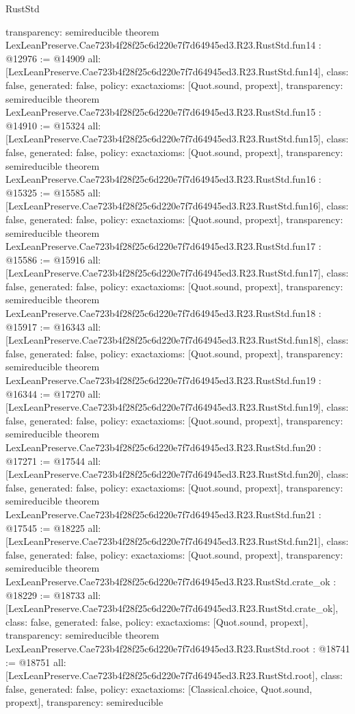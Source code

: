 \begin{lexlean}{RustStd}
\begin{coremodule}
{  transparency: semireducible
}
theorem LexLeanPreserve.Cae723b4f28f25c6d220e7f7d64945ed3.R23.RustStd.fun14 : @12976 := @14909 {
  all: [LexLeanPreserve.Cae723b4f28f25c6d220e7f7d64945ed3.R23.RustStd.fun14],
  class: false,
  generated: false,
  policy: exact{axioms: [Quot.sound, propext]},
  transparency: semireducible
}
theorem LexLeanPreserve.Cae723b4f28f25c6d220e7f7d64945ed3.R23.RustStd.fun15 : @14910 := @15324 {
  all: [LexLeanPreserve.Cae723b4f28f25c6d220e7f7d64945ed3.R23.RustStd.fun15],
  class: false,
  generated: false,
  policy: exact{axioms: [Quot.sound, propext]},
  transparency: semireducible
}
theorem LexLeanPreserve.Cae723b4f28f25c6d220e7f7d64945ed3.R23.RustStd.fun16 : @15325 := @15585 {
  all: [LexLeanPreserve.Cae723b4f28f25c6d220e7f7d64945ed3.R23.RustStd.fun16],
  class: false,
  generated: false,
  policy: exact{axioms: [Quot.sound, propext]},
  transparency: semireducible
}
theorem LexLeanPreserve.Cae723b4f28f25c6d220e7f7d64945ed3.R23.RustStd.fun17 : @15586 := @15916 {
  all: [LexLeanPreserve.Cae723b4f28f25c6d220e7f7d64945ed3.R23.RustStd.fun17],
  class: false,
  generated: false,
  policy: exact{axioms: [Quot.sound, propext]},
  transparency: semireducible
}
theorem LexLeanPreserve.Cae723b4f28f25c6d220e7f7d64945ed3.R23.RustStd.fun18 : @15917 := @16343 {
  all: [LexLeanPreserve.Cae723b4f28f25c6d220e7f7d64945ed3.R23.RustStd.fun18],
  class: false,
  generated: false,
  policy: exact{axioms: [Quot.sound, propext]},
  transparency: semireducible
}
theorem LexLeanPreserve.Cae723b4f28f25c6d220e7f7d64945ed3.R23.RustStd.fun19 : @16344 := @17270 {
  all: [LexLeanPreserve.Cae723b4f28f25c6d220e7f7d64945ed3.R23.RustStd.fun19],
  class: false,
  generated: false,
  policy: exact{axioms: [Quot.sound, propext]},
  transparency: semireducible
}
theorem LexLeanPreserve.Cae723b4f28f25c6d220e7f7d64945ed3.R23.RustStd.fun20 : @17271 := @17544 {
  all: [LexLeanPreserve.Cae723b4f28f25c6d220e7f7d64945ed3.R23.RustStd.fun20],
  class: false,
  generated: false,
  policy: exact{axioms: [Quot.sound, propext]},
  transparency: semireducible
}
theorem LexLeanPreserve.Cae723b4f28f25c6d220e7f7d64945ed3.R23.RustStd.fun21 : @17545 := @18225 {
  all: [LexLeanPreserve.Cae723b4f28f25c6d220e7f7d64945ed3.R23.RustStd.fun21],
  class: false,
  generated: false,
  policy: exact{axioms: [Quot.sound, propext]},
  transparency: semireducible
}
theorem LexLeanPreserve.Cae723b4f28f25c6d220e7f7d64945ed3.R23.RustStd.crate_ok : @18229 := @18733 {
  all: [LexLeanPreserve.Cae723b4f28f25c6d220e7f7d64945ed3.R23.RustStd.crate_ok],
  class: false,
  generated: false,
  policy: exact{axioms: [Quot.sound, propext]},
  transparency: semireducible
}
theorem LexLeanPreserve.Cae723b4f28f25c6d220e7f7d64945ed3.R23.RustStd.root : @18741 := @18751 {
  all: [LexLeanPreserve.Cae723b4f28f25c6d220e7f7d64945ed3.R23.RustStd.root],
  class: false,
  generated: false,
  policy: exact{axioms: [Classical.choice, Quot.sound, propext]},
  transparency: semireducible
}


\end{coremodule}
\end{lexlean}
